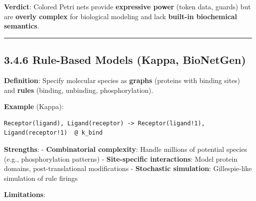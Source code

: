 \textbf{Verdict}: Colored Petri nets provide \textbf{expressive power}
(token data, guards) but are \textbf{overly complex} for biological
modeling and lack \textbf{built-in biochemical semantics}.

\begin{center}\rule{0.5\linewidth}{0.5pt}\end{center}

\hypertarget{rule-based-models-kappa-bionetgen}{%
\subsection{3.4.6 Rule-Based Models (Kappa,
BioNetGen)}\label{rule-based-models-kappa-bionetgen}}

\textbf{Definition}: Specify molecular species as \textbf{graphs}
(proteins with binding sites) and \textbf{rules} (binding, unbinding,
phosphorylation).

\textbf{Example} (Kappa):

\begin{lstlisting}
Receptor(ligand), Ligand(receptor) -> Receptor(ligand!1), Ligand(receptor!1)  @ k_bind
\end{lstlisting}

\textbf{Strengths}: - \checkmark \textbf{Combinatorial complexity}: Handle
millions of potential species (e.g., phosphorylation patterns) - \checkmark
\textbf{Site-specific interactions}: Model protein domains,
post-translational modifications - \checkmark \textbf{Stochastic simulation}:
Gillespie-like simulation of rule firings

\textbf{Limitations}:

